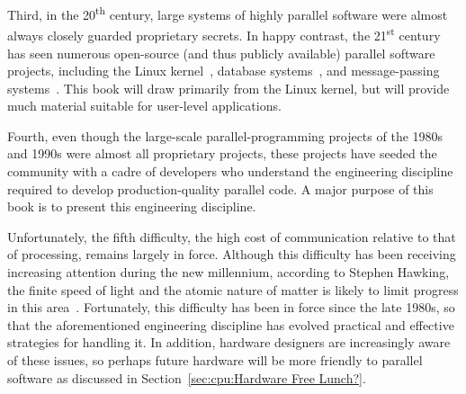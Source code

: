 Third, in the 20\textsuperscript{th} century, large systems of
highly parallel software were almost always closely guarded proprietary
secrets.
In happy contrast, the 21\textsuperscript{st} century has seen numerous
open-source (and thus publicly available) parallel software projects,
including the Linux kernel~\cite{Torvalds2.6kernel},
database systems~\cite{PostgreSQL2008,MySQL2008},
and message-passing systems~\cite{OpenMPI2008,BOINC2008}.
This book will draw primarily from the Linux kernel, but will
provide much material suitable for user-level applications.

Fourth, even though the large-scale parallel-programming projects of
the 1980s and 1990s were almost all proprietary projects, these
projects have seeded the community with a cadre of developers who
understand the engineering discipline required to develop production-quality
parallel code.
A major purpose of this book is to present this engineering discipline.

Unfortunately, the fifth difficulty, the high cost of communication
relative to that of processing, remains largely in force.
Although this difficulty has been receiving increasing attention during
the new millennium, according to Stephen Hawking,
the finite speed of light and the atomic
nature of matter is likely to limit progress in this
area~\cite{BryanGardiner2007,GordonMoore03a}.
Fortunately, this difficulty has been in force since the late 1980s,
so that the aforementioned engineering discipline has evolved practical
and effective strategies for handling it.
In addition, hardware designers are increasingly aware of these issues,
so perhaps future hardware will be more friendly to parallel software
as discussed in Section~\ref{sec:cpu:Hardware Free Lunch?}.

